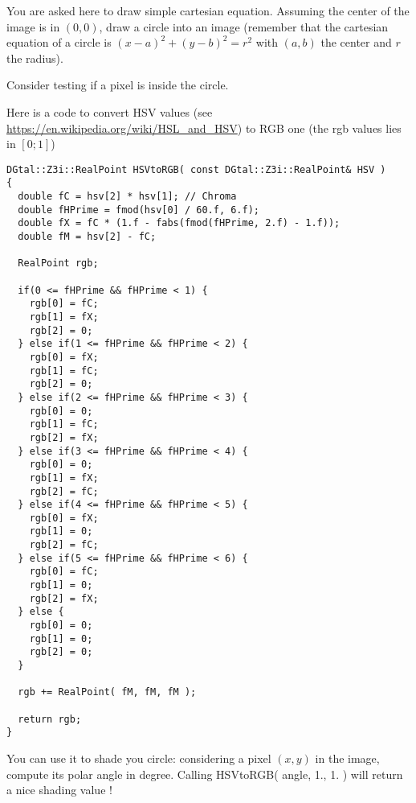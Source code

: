 \documentclass[a4paper, 11pt]{article}
\begin{document}
You are asked here to draw simple cartesian equation.
Assuming the center of the image is in $(0,0)$,
draw a circle into an image (remember that the cartesian equation of a circle is $(x - a)^2 + (y - b)^2 = r^2$ with $(a,b)$ the center and $r$ the radius).

\begin{hints}
  Consider testing if a pixel is inside the circle.
\end{hints}

Here is a code to convert HSV values (see \url{https://en.wikipedia.org/wiki/HSL_and_HSV}) to RGB one (the rgb values lies in $[0;1]$)

\begin{verbatim}
DGtal::Z3i::RealPoint HSVtoRGB( const DGtal::Z3i::RealPoint& HSV )
{
  double fC = hsv[2] * hsv[1]; // Chroma
  double fHPrime = fmod(hsv[0] / 60.f, 6.f);
  double fX = fC * (1.f - fabs(fmod(fHPrime, 2.f) - 1.f));
  double fM = hsv[2] - fC;

  RealPoint rgb;

  if(0 <= fHPrime && fHPrime < 1) {
    rgb[0] = fC;
    rgb[1] = fX;
    rgb[2] = 0;
  } else if(1 <= fHPrime && fHPrime < 2) {
    rgb[0] = fX;
    rgb[1] = fC;
    rgb[2] = 0;
  } else if(2 <= fHPrime && fHPrime < 3) {
    rgb[0] = 0;
    rgb[1] = fC;
    rgb[2] = fX;
  } else if(3 <= fHPrime && fHPrime < 4) {
    rgb[0] = 0;
    rgb[1] = fX;
    rgb[2] = fC;
  } else if(4 <= fHPrime && fHPrime < 5) {
    rgb[0] = fX;
    rgb[1] = 0;
    rgb[2] = fC;
  } else if(5 <= fHPrime && fHPrime < 6) {
    rgb[0] = fC;
    rgb[1] = 0;
    rgb[2] = fX;
  } else {
    rgb[0] = 0;
    rgb[1] = 0;
    rgb[2] = 0;
  }

  rgb += RealPoint( fM, fM, fM );

  return rgb;
}
\end{verbatim}

You can use it to shade you circle: considering a pixel $(x,y)$ in the image, compute its polar angle in degree.
Calling HSVtoRGB( angle, 1., 1. ) will return a nice shading value !
\end{document}
